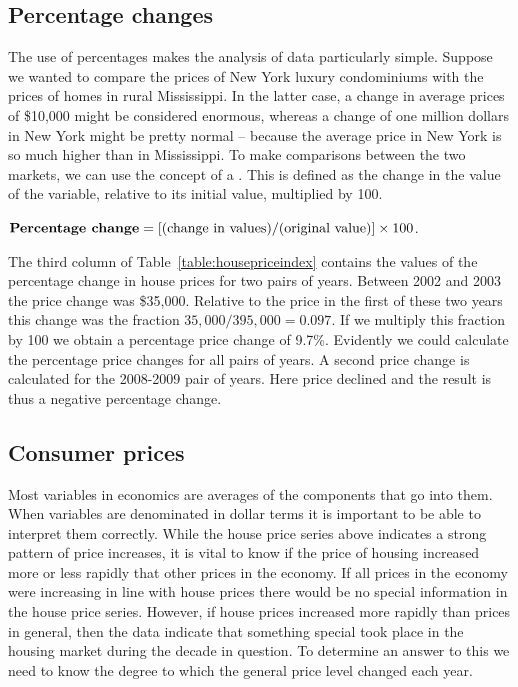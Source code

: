 

\newhtmlpage



\newhtmlpage

\subsection*{Percentage changes}

The use of percentages makes the analysis of data particularly simple.
Suppose we wanted to compare the prices of New York luxury condominiums with
the prices of homes in rural Mississippi. In the latter case, a change in
average prices of \$10,000 might be considered enormous, whereas a change of
one million dollars in New York might be pretty normal -- because the
average price in New York is so much higher than in Mississippi. To make
comparisons between the two markets, we can use the concept of a %
. This is defined as the change in the value
of the variable, relative to its initial value, multiplied by 100.

\begin{DefBox}
$\text{\textbf{Percentage change}}=[(\text{change in values})/(\text{original value})]\times 100$.
\end{DefBox}

The third column of Table~\ref{table:housepriceindex} contains the values of the percentage change
in house prices for two pairs of years. Between 2002 and 2003 the price
change was \$35,000. Relative to the price in the first of these two years
this change was the fraction $35,000/395,000=0.097$. If we multiply this
fraction by 100 we obtain a percentage price change of 9.7\%. Evidently we
could calculate the percentage price changes for all pairs of years. A
second price change is calculated for the 2008-2009 pair of years. Here 
price declined and the result is thus a negative percentage change.

\newhtmlpage

\subsection*{Consumer prices}

Most variables in economics are averages of the components that go into
them. When variables are denominated in dollar terms it is important to be
able to interpret them correctly. While the house price series above
indicates a strong pattern of price increases, it is vital to know if the
price of housing increased more or less rapidly that other prices in the
economy. If all prices in the economy were increasing in line with house
prices there would be no special information in the house price series.
However, if house prices increased more rapidly than prices in general, then
the data indicate that something special took place in the housing market
during the decade in question. To determine an answer to this we need to
know the degree to which the general price level changed each year.

